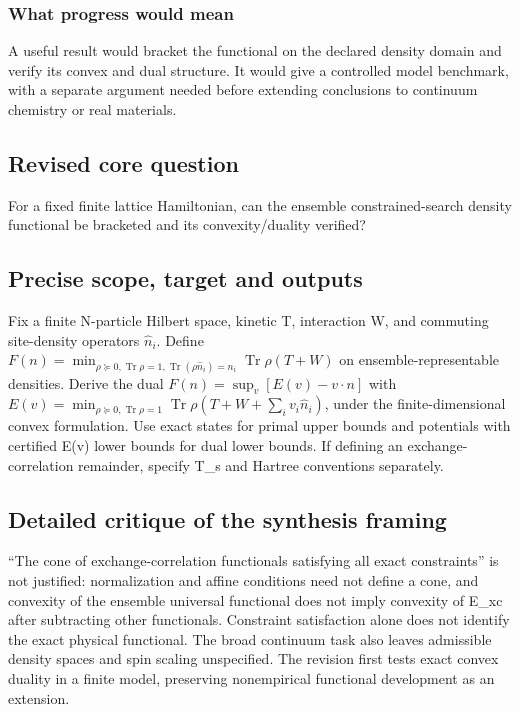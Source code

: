 \documentclass[
  11pt,
]{article}
\newcounter{none} %
\begin{document}
\subsubsection{What progress would mean}

A useful result would bracket the functional on the declared density
domain and verify its convex and dual structure. It would give a
controlled model benchmark, with a separate argument needed before
extending conclusions to continuum chemistry or real materials.

\subsection{Revised core question}

For a fixed finite lattice Hamiltonian, can the ensemble
constrained-search density functional be bracketed and its
convexity/duality verified?

\subsection{Precise scope, target and outputs}

Fix a finite N-particle Hilbert space, kinetic T, interaction W, and
commuting site-density operators \(\widehat n_i\). Define
\(F(n)=\min_{\rho\succeq0,\operatorname{Tr}\rho=1,\operatorname{Tr}(\rho\widehat n_i)=n_i}\operatorname{Tr}\rho(T+W)\)
on ensemble-representable densities. Derive the dual
\(F(n)=\sup_v[E(v)-v\cdot n]\) with
\(E(v)=\min_{\rho\succeq0,\operatorname{Tr}\rho=1}\operatorname{Tr}\rho(T+W+\sum_i v_i\widehat n_i)\),
under the finite-dimensional convex formulation. Use exact states for
primal upper bounds and potentials with certified E(v) lower bounds for
dual lower bounds. If defining an exchange-correlation remainder,
specify T\_s and Hartree conventions separately.

\subsection{Detailed critique of the synthesis framing}

``The cone of exchange-correlation functionals satisfying all exact
constraints'' is not justified: normalization and affine conditions need
not define a cone, and convexity of the ensemble universal functional
does not imply convexity of E\_xc after subtracting other functionals.
Constraint satisfaction alone does not identify the exact physical
functional. The broad continuum task also leaves admissible density
spaces and spin scaling unspecified. The revision first tests exact
convex duality in a finite model, preserving nonempirical functional
development as an extension.
\end{document}
